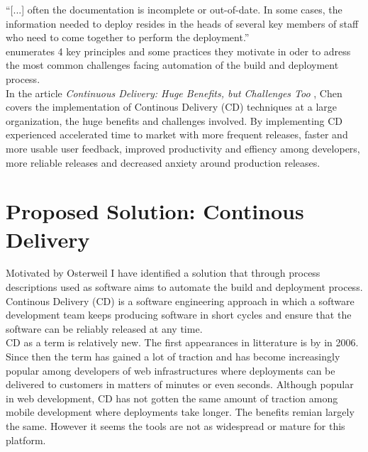 \documentclass{ituthesis}
\begin{document}
``[...] often the documentation is incomplete or out-of-date. In some cases, the information needed to deploy resides in the heads of several key members of staff who need to come together to perform the deployment.'' \cite{Humble2006} \\

\cite{Humble2006} enumerates 4 key principles and some practices they motivate in oder to adress the most common challenges facing automation of the build and deployment process.\\

In the article \textit{Continuous Delivery: Huge Benefits, but Challenges Too} \cite{Chen2015}, Chen covers the implementation of Continous Delivery (CD) techniques at a large organization, the huge benefits and challenges involved. By implementing CD \cite{Chen2015} experienced accelerated time to market with more frequent releases, faster and more usable user feedback, improved productivity and effiency among developers, more reliable releases and decreased anxiety around production releases.\\


\chapter{Proposed Solution: Continous Delivery}

Motivated by Osterweil \cite{Osterweil1997} I have identified a solution that through process descriptions used as software aims to automate the build and deployment process.\\

Continous Delivery (CD) is a software engineering approach in which a software development team keeps producing software in short cycles and ensure that the software can be reliably released at any time.\\


CD as a term is relatively new. The first appearances in litterature is by \cite{Humble2006} in 2006. Since then the term has gained a lot of traction and has become increasingly popular among developers of web infrastructures where deployments can be delivered to customers in matters of minutes or even seconds. Although popular in web development, CD has not gotten the same amount of traction among mobile development where deployments take longer. The benefits remian largely the same. However it seems the tools are not as widespread or mature for this platform.\\
\end{document}
